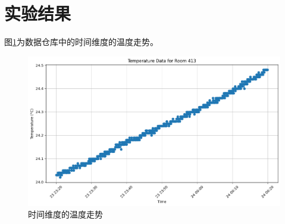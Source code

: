 \section{实验结果}
图\ref{output}为数据仓库中的时间维度的温度走势。

\begin{figure}[!htbp]
    \centering
    \includegraphics[width=\textwidth]{images/output.png}
    \caption{时间维度的温度走势}\label{output}
\end{figure}
